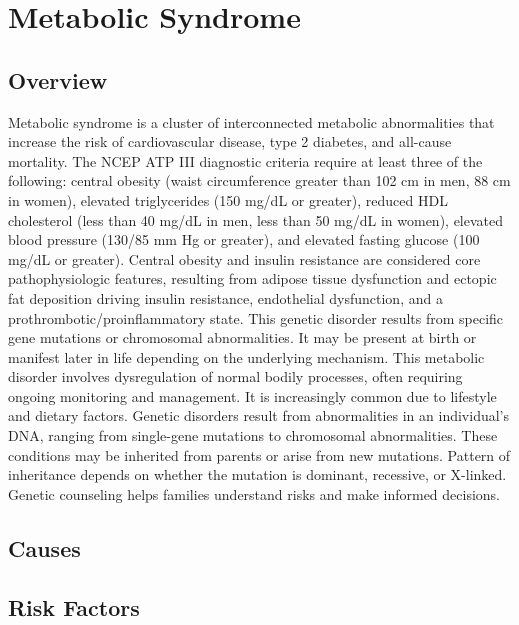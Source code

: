 \chapter{Metabolic Syndrome}
\label{sec:Metabolic Syndrome}

\section{Overview}
Metabolic syndrome is a cluster of interconnected metabolic abnormalities that increase the risk of cardiovascular disease, type 2 diabetes, and all-cause mortality. The NCEP ATP III diagnostic criteria require at least three of the following: central obesity (waist circumference greater than 102 cm in men, 88 cm in women), elevated triglycerides (150 mg/dL or greater), reduced HDL cholesterol (less than 40 mg/dL in men, less than 50 mg/dL in women), elevated blood pressure (130/85 mm Hg or greater), and elevated fasting glucose (100 mg/dL or greater). Central obesity and insulin resistance are considered core pathophysiologic features, resulting from adipose tissue dysfunction and ectopic fat deposition driving insulin resistance, endothelial dysfunction, and a prothrombotic/proinflammatory state. This genetic disorder results from specific gene mutations or chromosomal abnormalities. It may be present at birth or manifest later in life depending on the underlying mechanism. This metabolic disorder involves dysregulation of normal bodily processes, often requiring ongoing monitoring and management. It is increasingly common due to lifestyle and dietary factors. Genetic disorders result from abnormalities in an individual's DNA, ranging from single-gene mutations to chromosomal abnormalities. These conditions may be inherited from parents or arise from new mutations. Pattern of inheritance depends on whether the mutation is dominant, recessive, or X-linked. Genetic counseling helps families understand risks and make informed decisions.
\section{Causes}
\section{Risk Factors}

